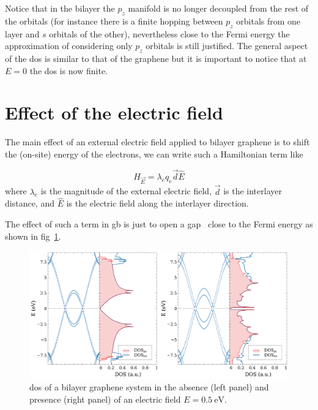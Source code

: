 Notice that in the bilayer the $p_z$ manifold is no longer decoupled from the rest of the orbitals (for instance there is a finite hopping between $p_z$ orbitals from one layer and $s$ orbitals of the other), nevertheless close to the Fermi energy the approximation of considering only $p_z$ orbitals is still justified.
The general aspect of the \ac{dos} is similar to that of the graphene but it is important to notice that at $E=0$ the \ac{dos} is now finite.

 \section{Effect of the electric field}
The main effect of an external electric field applied to bilayer graphene is to shift the (on-site) energy of the electrons, we can write such a Hamiltonian term like

\begin{equation}
  H_{\vec{E}} = \lambda_e q_e \vec{d} \widehat{E} %
\end{equation}
where $\lambda_e$ is the magnitude of the external electric field, $\vec{d}$ is the interlayer distance, and $\widehat{E}$ is the electric field along the interlayer direction.

The effect of such a term in \ac{gb} is just to open a gap~\cite{Zhang2009,Yamashiro2012,Brihuega2012,Lam2008,Min2007} close to the Fermi energy as shown in fig~\ref{bi_Efield}.

\begin{figure}[!ht]
  \centering
  \includegraphics[width=\textwidth]{chapter06/figures/bilayer_elec.pdf}
  \vspace{-10pt}
  \caption{\ac{dos} of a bilayer graphene system in the absence (left panel) and presence (right panel) of an electric field $E=\SI{0.5}{\eV}$.} %
  \label{bi_Efield}
\end{figure}
\FloatBarrier

